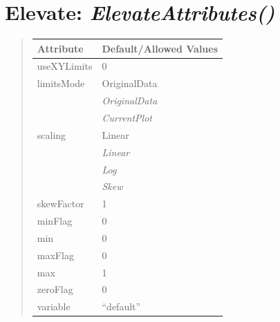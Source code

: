 \documentclass[letterpaper,10pt,english]{sphinxmanual}
\begin{document}
\begin{DUlineblock}{0em}
\item[] 
\end{DUlineblock}

\begin{DUlineblock}{0em}
\item[] 
\end{DUlineblock}


\section{\textbf{Elevate}: \emph{ElevateAttributes()}}
\label{attributes:elevate-elevateattributes}
\begin{DUlineblock}{0em}
\item[] 
\end{DUlineblock}
\begin{quote}

\begin{tabulary}{\linewidth}{|L|L|}
\hline

\textbf{Attribute}
 & 
\textbf{Default/Allowed Values}
\\
\hline
useXYLimits
 & 
0
\\
\hline
limitsMode
 & 
OriginalData
\\
\hline & 
\emph{OriginalData}
\\
\hline & 
\emph{CurrentPlot}
\\
\hline
scaling
 & 
Linear
\\
\hline & 
\emph{Linear}
\\
\hline & 
\emph{Log}
\\
\hline & 
\emph{Skew}
\\
\hline
skewFactor
 & 
1
\\
\hline
minFlag
 & 
0
\\
\hline
min
 & 
0
\\
\hline
maxFlag
 & 
0
\\
\hline
max
 & 
1
\\
\hline
zeroFlag
 & 
0
\\
\hline
variable
 & 
``default''
\\
\hline\end{tabulary}

\end{quote}

\begin{DUlineblock}{0em}
\item[] 
\end{DUlineblock}

\begin{DUlineblock}{0em}
\item[] 
\end{DUlineblock}
\end{document}
